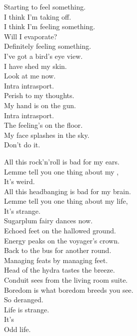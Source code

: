 Starting to feel something. \\
I think I'm taking off. \\
I think I'm feeling something. \\
Will I evaporate? \\
Definitely feeling something. \\
I've got a bird's eye view. \\
I have shed my skin. \\
Look at me now. \\

Intra intrasport. \\
Perish to my thoughts. \\
My hand is on the gun. \\
Intra intrasport. \\
The feeling's on the floor. \\
My face splashes in the sky. \\

Don't do it. \\





All this rock'n'roll is bad for my ears. \\
Lemme tell you one thing about my , \\
It's weird. \\
All this headbanging is bad for my brain. \\
Lemme tell you one thing about my life, \\
It's strange. \\

Sugarplum fairy dances now. \\
Echoed feet on the hallowed ground. \\
Energy peaks on the voyager's crown. \\
Back to the bus for another round. \\
Managing feats by managing feet. \\
Head of the hydra tastes the breeze. \\
Conduit sees from the living room suite. \\
Boredom is what boredom breeds you see. \\

So deranged. \\
Life is strange. \\
It's  \\
Odd life. \\

